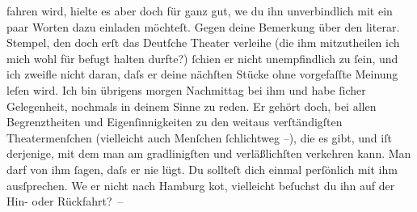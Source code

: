                fahren wird, hielte es aber doch für ganz gut, we{\geminationn} du
               ihn unverbindlich mit ein paar {\pb}Worten dazu einladen
               möchteſt. Gegen deine Bemerkung über den literar. Stempel, den doch erſt das Deutſche Theater verleihe (die ihm mitzutheilen ich
               mich wohl für befugt halten durfte?){ }ſchien er nicht unempfindlich zu{ }ſein, und ich
               zweifle nicht daran, daſs er deine nächſten Stücke ohne vorgefaſſte Meinung leſen
               wird. Ich bin übrigens mor{\pb}gen Nachmittag bei ihm
               und habe{ }ſicher Gelegenheit, nochmals in deinem Sinne zu reden. Er gehört doch, bei
               allen Begrenztheiten und Eigenſinnigkeiten zu den weitaus verſtändigſten
               Theatermenſchen \introOben{}(vielleicht auch Menſchen{ }ſchlichtweg –)\introOben{},
               die es gibt, und iſt derjenige, mit dem man am gradlinigſten und verläßlichſten
               verkehren kann. Man darf von ihm{ }ſagen, daſs {\pb}er nie lügt. Du
               sollteſt dich einmal perſönlich mit ihm ausſprechen. We{\geminationn}
               er nicht nach Hamburg ko{\geminationm}t, vielleicht beſuchst du ihn auf der Hin- oder
               Rückfahrt? –\pend
           
